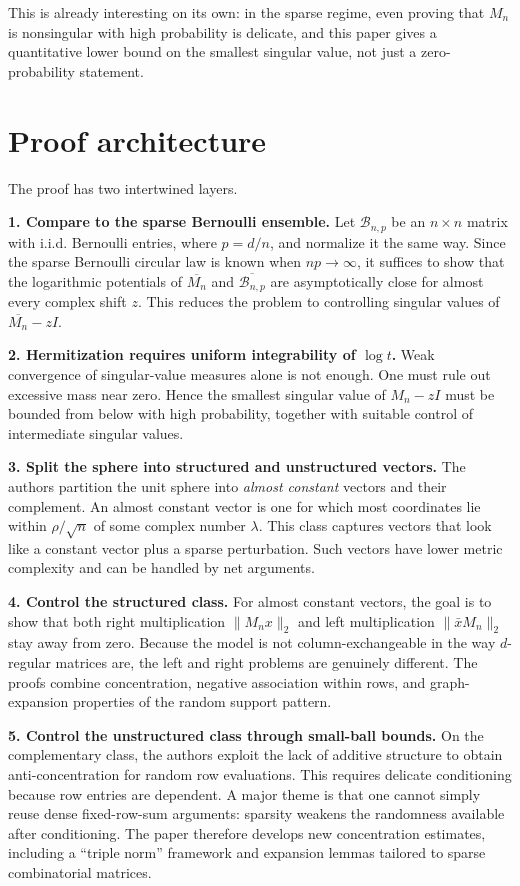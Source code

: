 \documentclass[11pt]{article}
\begin{document}
This is already interesting on its own: in the sparse regime, even proving that $M_n$ is nonsingular with high probability is delicate, and this paper gives a quantitative lower bound on the smallest singular value, not just a zero-probability statement.

\section*{Proof architecture}
The proof has two intertwined layers.

\textbf{1. Compare to the sparse Bernoulli ensemble.} Let $\mathcal B_{n,p}$ be an $n\times n$ matrix with i.i.d. Bernoulli entries, where $p=d/n$, and normalize it the same way. Since the sparse Bernoulli circular law is known when $np\to\infty$, it suffices to show that the logarithmic potentials of $\overline{M_n}$ and $\overline{\mathcal B_{n,p}}$ are asymptotically close for almost every complex shift $z$. This reduces the problem to controlling singular values of $\overline{M_n}-zI$.

\textbf{2. Hermitization requires uniform integrability of $\log t$.} Weak convergence of singular-value measures alone is not enough. One must rule out excessive mass near zero. Hence the smallest singular value of $M_n-zI$ must be bounded from below with high probability, together with suitable control of intermediate singular values.

\textbf{3. Split the sphere into structured and unstructured vectors.} The authors partition the unit sphere into \emph{almost constant} vectors and their complement. An almost constant vector is one for which most coordinates lie within $\rho/\sqrt n$ of some complex number $\lambda$. This class captures vectors that look like a constant vector plus a sparse perturbation. Such vectors have lower metric complexity and can be handled by net arguments.

\textbf{4. Control the structured class.} For almost constant vectors, the goal is to show that both right multiplication $\|M_nx\|_2$ and left multiplication $\|\bar x M_n\|_2$ stay away from zero. Because the model is not column-exchangeable in the way $d$-regular matrices are, the left and right problems are genuinely different. The proofs combine concentration, negative association within rows, and graph-expansion properties of the random support pattern.

\textbf{5. Control the unstructured class through small-ball bounds.} On the complementary class, the authors exploit the lack of additive structure to obtain anti-concentration for random row evaluations. This requires delicate conditioning because row entries are dependent. A major theme is that one cannot simply reuse dense fixed-row-sum arguments: sparsity weakens the randomness available after conditioning. The paper therefore develops new concentration estimates, including a ``triple norm'' framework and expansion lemmas tailored to sparse combinatorial matrices.
\end{document}
